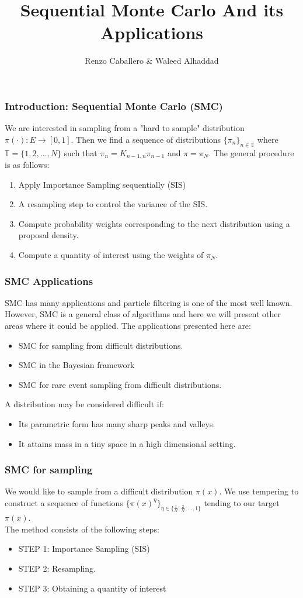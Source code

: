 \documentclass[aspectratio=169]{beamer}\usepackage[utf8]{inputenc}
\title{Sequential Monte Carlo And  its Applications}
\subtitle{Renzo Caballero \& Waleed Alhaddad}
\newcommand{\T}{\mathbb{T}}
\begin{document}
\begin{frame}
\titlepage
\end{frame}

\begin{frame}\frametitle{Introduction: Sequential Monte Carlo (SMC)}
We are interested in sampling from a "hard to sample" distribution  $\pi (\cdot): E \rightarrow [0,1] $. Then we find a sequence of distributions $\{\pi_n  \}_{n\in \T}$ where $\T = \{ 1,2, \ldots , N  \}$  such that $\pi_n = K_{n-1,n}\pi_{n-1} $ and $\pi = \pi_N $. The general  procedure is as follows:
\begin{enumerate}
\item Apply Importance Sampling sequentially (SIS)
\item A resampling step to control the variance of the SIS.
\item Compute probability weights corresponding  to the next distribution using a proposal  density.
\item Compute a quantity of interest using the weights of $\pi_N$.
\end{enumerate}
\end{frame}

\begin{frame}\frametitle{SMC Applications }

SMC has many applications and particle filtering is one of the most well known. However, SMC is a general class of algorithms and here we will present other areas where it could be applied. The applications presented here are:
\begin{itemize}
\item SMC for sampling from difficult distributions.
\item SMC in  the  Bayesian  framework
\item SMC for rare event sampling from difficult distributions.
\end{itemize}
A distribution may be  considered difficult if:
\begin{itemize}
\item Its parametric form has many sharp peaks and valleys.
\item It attains mass in a tiny space in a high dimensional setting. 
\end{itemize}

\end{frame}

\begin{frame}\frametitle{SMC for sampling }
We would like to sample from a difficult distribution $\pi (x)$. We use tempering to construct a sequence of functions $\{ \pi (x)^\eta \}_{\eta \in \{ \frac{1}{N}, \frac{2}{N}, \ldots , 1 \}}$ tending to  our target  $\pi (x)$.\\
The method consists of the following steps:
\begin{itemize}
\item STEP 1:  Importance Sampling  (SIS)
\item STEP 2: Resampling.
\item STEP 3: Obtaining  a quantity of interest 

\end{itemize}
\end{frame}
\end{document}
